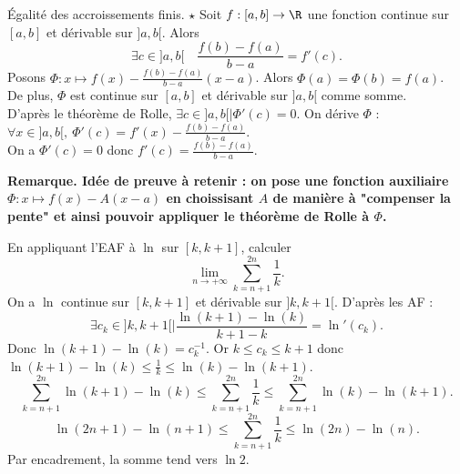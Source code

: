 \documentclass[11pt]{article}
\begin{document}
\begin{thm}{Égalité des accroissements finis. $\star$}{}
    Soit $f:[a,b]\to\R$ une fonction continue sur $[a,b]$ et dérivable sur $]a,b[$. Alors
    \begin{equation*}
        \exists c \in ]a,b[ \quad \frac{f(b)-f(a)}{b-a}=f'(c).
    \end{equation*}
    \tcblower
    Posons $\Phi:x\mapsto f(x)-\frac{f(b)-f(a)}{b-a}(x-a)$. Alors $\Phi(a)=\Phi(b)=f(a)$.\\
    De plus, $\Phi$ est continue sur $[a,b]$ et dérivable sur $]a,b[$ comme somme.\\
    D'après le théorème de Rolle, $\exists c \in ]a,b[ \mid \Phi'(c)=0$. On dérive $\Phi$ : $\forall x \in ]a,b[, ~ \Phi'(c)=f'(x)-\frac{f(b)-f(a)}{b-a}$.\\
    On a $\Phi'(c)=0$ donc $f'(c)=\frac{f(b)-f(a)}{b-a}$.
\end{thm}

\vspace*{0.4cm}

\bf{Remarque.} Idée de preuve à retenir : on pose une fonction auxiliaire $\Phi:x\mapsto f(x)-A(x-a)$ en choissisant $A$ de manière à "compenser la pente" et ainsi pouvoir appliquer le théorème de Rolle à $\Phi$.

\vspace*{0.8cm}

\begin{ex}{}{}
    En appliquant l'EAF à $\ln$ sur $[k,k+1]$, calculer
    \begin{equation*}
        \lim_{n\to+\infty}\sum_{k=n+1}^{2n}\frac{1}{k}.
    \end{equation*}
    \tcblower
    On a $\ln$ continue sur $[k,k+1]$ et dérivable sur $]k,k+1[$. D'après les AF :
    \begin{equation*}
        \exists c_k \in ]k,k+1[ \mid \frac{\ln(k+1)-\ln(k)}{k+1-k}=\ln'(c_k).
    \end{equation*}
    Donc $\ln(k+1)-\ln(k)=c_k^{-1}$. Or $k\leq c_k \leq k+1$ donc $\ln(k+1)-\ln(k)\leq\frac{1}{k}\leq\ln(k)-\ln(k+1)$.
    \begin{equation*}
        \sum_{k=n+1}^{2n}\ln(k+1)-\ln(k) \leq \sum_{k=n+1}^{2n}\frac{1}{k}\leq\sum_{k=n+1}^{2n}\ln(k)-\ln(k+1).
    \end{equation*}
    \begin{equation*}
        \ln(2n+1)-\ln(n+1)\leq\sum_{k=n+1}^{2n}\frac{1}{k}\leq\ln(2n)-\ln(n).
    \end{equation*}
    Par encadrement, la somme tend vers $\ln2$.
\end{ex}
\end{document}
